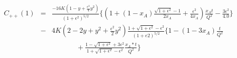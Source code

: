    \begin{eqnarray}
   C_{++}(1) &=&
   \frac{-16K(1-y+\frac{\epsilon^{2}}{4}y^2)}{(1+\epsilon^{2})^{5/2}}\bigg\{\left(1+(1-x_A)\frac{\sqrt{1+\epsilon^{2}}-1}{2x_A} 
   + \frac{\epsilon^{2}}{4x_A}\right) 
\frac{x_At}{Q^2}-\frac{3\epsilon^{2}}{4.0} \bigg\} \nonumber \\&-& 4K \left( 
2-2y+y^2+\frac{\epsilon^{2}}{2}y^2\right)\frac{1+\sqrt{1+\epsilon^{2}}-\epsilon^{2}}{(1+e2)^{5/2}}\bigg\{1-(1-3x_A)\frac{t}{Q^2}\nonumber\\&\,\,\,\,&\,\,\,\,\,\,\,\,\,\,\,\,\,\,\,\,\,\,\,\,\,+\frac{1-\sqrt{1+\epsilon^{2}}+3\epsilon^{2}}{1+\sqrt{1+\epsilon^{2}}-\epsilon^{2}} 
\frac{x_A*t}{Q^2}\bigg\} \label{eq:c1I}
\end{eqnarray}


\normalsize


